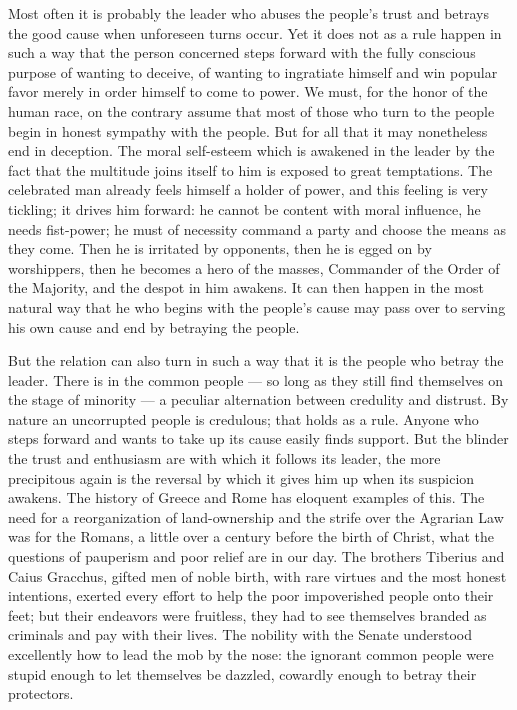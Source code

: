 \documentclass[12pt,a4paper,openany]{book}
\newcommand{\opage}[1]{\marginnote{\footnotesize\textit{[#1]}}}
\begin{document}
Most often it is probably the leader who abuses the people's
trust and betrays the good cause when unforeseen
turns occur. Yet it does not as a rule happen in such a way
that the person concerned steps forward with the fully conscious
purpose of wanting to deceive, of wanting to ingratiate himself
and win popular favor merely in order himself to come to power.
We must, for the honor of the human race, on the contrary
\setcounter{footnote}{0}%
\opage{46}assume that most of those who turn to
the people begin in honest sympathy with the people. But
for all that it may nonetheless end in deception. The
moral self-esteem which is awakened in the leader by the fact
that the multitude joins itself to him is exposed to great temptations.
The celebrated man already feels himself a holder of power, and
this feeling is very tickling; it drives him forward:
he cannot be content with moral influence, he needs
fist-power; he must of necessity command
a party and choose the means as they come. Then
he is irritated by opponents, then he is egged on by worshippers, then
he becomes a hero of the masses, Commander of the Order of the Majority,
and the despot in him awakens. It can then happen in the
most natural way that he who begins with the people's
cause may pass over to serving his own cause and
end by betraying the people.

But the relation can also turn in such a way that
it is the people who betray the leader. There is in the
common people --- so long as they still find themselves on
the stage of minority --- a peculiar alternation between
credulity and distrust. By nature an uncorrupted
people is credulous; that holds as a rule. Anyone who
steps forward and wants to take up its cause easily finds support.
But the blinder the trust and enthusiasm are
with which it follows its leader, the more precipitous again
is the reversal by which it gives him up when its suspicion
awakens. The history of Greece and Rome has
eloquent examples of this. The need for a reorganization of
land-ownership and the strife over the Agrarian Law was for the Romans,
a little over a century before the birth of Christ,
what the questions of pauperism and poor relief
are in our day. The brothers Tiberius and
\setcounter{footnote}{0}%
\opage{47}Caius Gracchus, gifted men of noble birth, with
rare virtues and the most honest intentions, exerted every effort
to help the poor impoverished people onto their feet;
but their endeavors were fruitless, they had to see
themselves branded as criminals and pay with their lives.
The nobility with the Senate understood excellently how to lead the mob
by the nose: the ignorant common people were stupid enough to
let themselves be dazzled, cowardly enough to betray their protectors.
\end{document}

